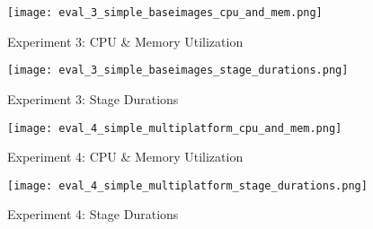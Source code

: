 \begin{figure}[H]
    \begin{adjustwidth}{-0.2\paperwidth}{-0.2\paperwidth}
        \centering
        \texttt{[image: eval\_3\_simple\_baseimages\_cpu\_and\_mem.png]}
        \caption{Experiment 3: CPU \& Memory Utilization}
        \label{fig:eval_3_cpu_and_mem}
    \end{adjustwidth}
\end{figure}

\begin{figure}[H]
    \centering
    \texttt{[image: eval\_3\_simple\_baseimages\_stage\_durations.png]}
    \caption{Experiment 3: Stage Durations}
    \label{fig:eval_3_simplest_stage_durations}
\end{figure}

\begin{figure}[H]
    \begin{adjustwidth}{-0.2\paperwidth}{-0.2\paperwidth}
        \centering
        \texttt{[image: eval\_4\_simple\_multiplatform\_cpu\_and\_mem.png]}
        \caption{Experiment 4: CPU \& Memory Utilization}
        \label{fig:eval_4_cpu_and_mem}
    \end{adjustwidth}
\end{figure}

\begin{figure}[H]
    \centering
    \texttt{[image: eval\_4\_simple\_multiplatform\_stage\_durations.png]}
    \caption{Experiment 4: Stage Durations}
    \label{fig:eval_4_simplest_stage_durations}
\end{figure}
